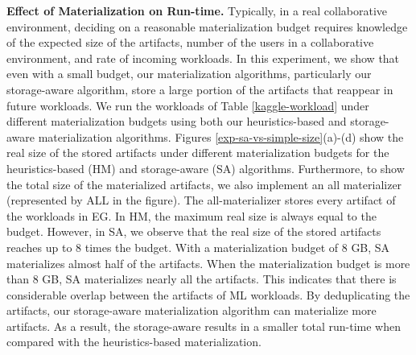 \textbf{Effect of Materialization on Run-time.}
Typically, in a real collaborative environment, deciding on a reasonable materialization budget requires knowledge of the expected size of the artifacts, number of the users in a collaborative environment, and rate of incoming workloads.
In this experiment, we show that even with a small budget, our materialization algorithms, particularly our storage-aware algorithm, store a large portion of the artifacts that reappear in future workloads.
We run the workloads of Table \ref{kaggle-workload} under different materialization budgets using both our heuristics-based and storage-aware materialization algorithms.
Figures \ref{exp-sa-vs-simple-size}(a)-(d) show the real size of the stored artifacts under different materialization budgets for the heuristics-based (HM) and storage-aware (SA) algorithms.
Furthermore, to show the total size of the materialized artifacts, we also implement an all materializer (represented by ALL in the figure).
The all-materializer stores every artifact of the workloads in EG.
In HM, the maximum real size is always equal to the budget.
However, in SA, we observe that the real size of the stored artifacts reaches up to 8 times the budget.
With a materialization budget of 8 GB, SA materializes almost half of the artifacts.
When the materialization budget is more than 8 GB, SA materializes nearly all the artifacts.
This indicates that there is considerable overlap between the artifacts of ML workloads.
By deduplicating the artifacts, our storage-aware materialization algorithm can materialize more artifacts.
As a result, the storage-aware results in a smaller total run-time when compared with the heuristics-based materialization.

